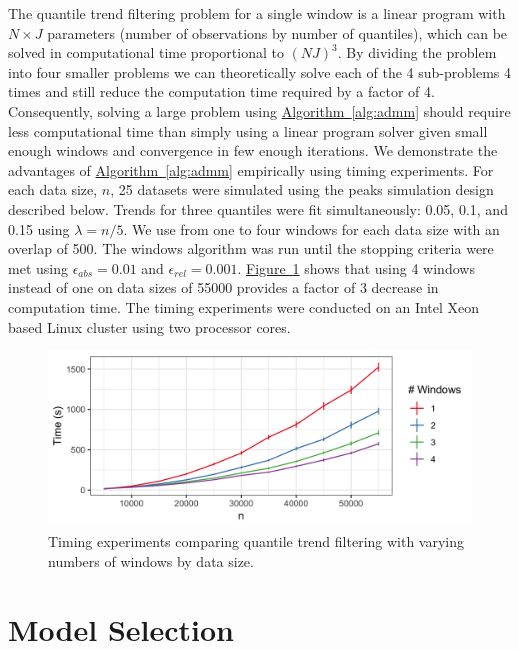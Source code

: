 \documentclass[aoas]{imsart}
\newcommand{\Fig}[1]{\hyperref[fig:#1]{Figure~\ref*{fig:#1}}} %
\newcommand{\Alg}[1]{\hyperref[alg:#1]{Algorithm~\ref*{alg:#1}}} %
\newcommand{\Fig}[1]{{Figure~\ref{fig:#1}}} %
\newcommand{\Alg}[1]{{Algorithm~\ref{alg:#1}}} %
\begin{document}
The quantile trend filtering problem for a single window is a linear program with $N\times J$ parameters (number of observations by number of quantiles), which can be solved in computational time proportional to $(NJ)^3$. By dividing the problem into four smaller problems we can theoretically solve each of the 4 sub-problems 4 times and still reduce the computation time required by a factor of 4. Consequently, solving a large problem using \Alg{admm} should require less computational time than simply using a linear program solver given small enough windows and convergence in few enough iterations. We demonstrate the advantages of \Alg{admm} empirically using timing experiments. For each data size, $n$, 25 datasets were simulated using the peaks simulation design described below. Trends for three quantiles were fit simultaneously: 0.05, 0.1, and 0.15 using $\lambda = n/5$. We use from one to four windows for each data size with an overlap of 500. The windows algorithm was run until the stopping criteria were met using $\epsilon_{abs} = 0.01$ and $\epsilon_{rel} = 0.001$. \Fig{timing} shows that using 4 windows instead of one on data sizes of 55000 provides a factor of 3 decrease in computation time. The timing experiments were conducted on an Intel Xeon based Linux cluster using two processor cores.


\begin{figure}[!t]
	\centering
	\includegraphics[width = 0.7\linewidth]{Figures/Fig_timing_experiment.png}
	\caption{Timing experiments comparing quantile trend filtering with varying numbers of windows by data size.}
	\label{fig:timing}
\end{figure}



\section{Model Selection}
\label{sec:lambda_choice}
\end{document}

